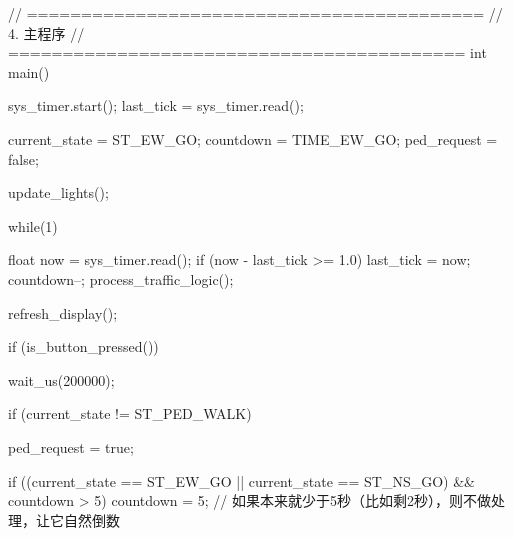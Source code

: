 \begin{cpp}
// ==========================================
// 4. 主程序
// ==========================================
int main() {
    sys_timer.start();
    last_tick = sys_timer.read();
    
    current_state = ST_EW_GO;
    countdown = TIME_EW_GO;
    ped_request = false;
    
    update_lights();

    while(1) {
        float now = sys_timer.read();
        if (now - last_tick >= 1.0) {
            last_tick = now;
            countdown--;
            process_traffic_logic();
        }

        refresh_display();

        if (is_button_pressed()) {
            wait_us(200000); 
            
            if (current_state != ST_PED_WALK) {
                ped_request = true;
                
                if ((current_state == ST_EW_GO || current_state == ST_NS_GO) && countdown > 5) {
                    countdown = 5; 
                }
                // 如果本来就少于5秒（比如剩2秒），则不做处理，让它自然倒数
            }
        }
    }
}
\end{cpp}